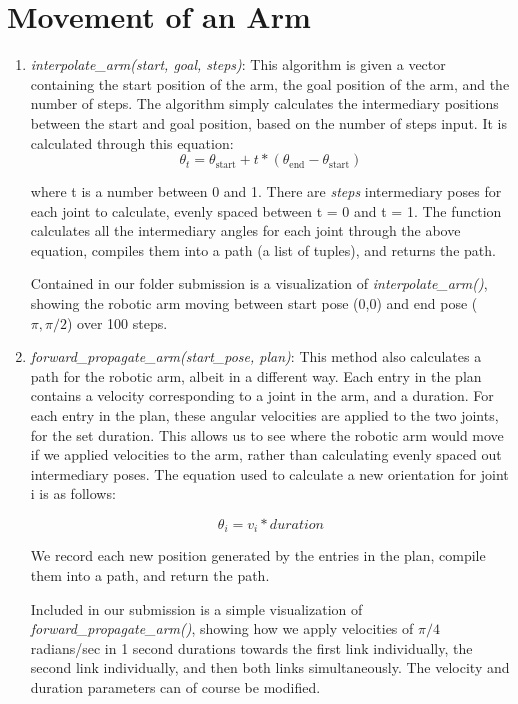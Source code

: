 \documentclass{article}
\begin{document}
\section{Movement of an Arm}
\begin{enumerate}
    \item \textit{interpolate\_arm(start, goal, steps)}: %
    This algorithm is given a vector containing the start position of the arm, the goal position of the arm, and the number of steps. The algorithm simply calculates the intermediary positions between the start and goal position, based on the number of steps input. It is calculated through this equation: 
\[\theta_t = \theta_{\text{start}} + t * (\theta_{\text{end}} - \theta_{\text{start}})\]

    where t is a number between 0 and 1. There are \textit{steps} intermediary poses for each joint to calculate, evenly spaced between t = 0 and t = 1. The function calculates all the intermediary angles for each joint through the above equation, compiles them into a path (a list of tuples), and returns the path.

    Contained in our folder submission is a visualization of \textit{interpolate\_arm()}, showing the robotic arm moving between start pose (0,0) and end pose (\(\pi, \pi/2\)) over 100 steps.

    \item \textit{forward\_propagate\_arm(start\_pose, plan)}: 
    This method also calculates a path for the robotic arm, albeit in a different way. Each entry in the plan contains a velocity corresponding to a joint in the arm, and a duration. For each entry in the plan, these angular velocities are applied to the two joints, for the set duration. This allows us to see where the robotic arm would move if we applied velocities to the arm, rather than calculating evenly spaced out intermediary poses. The equation used to calculate a new orientation for joint i is as follows:
    
\[\theta_i = v_i * duration\]

    We record each new position generated by the entries in the plan, compile them into a path, and return the path.

    Included in our submission is a simple visualization of \textit{forward\_propagate\_arm()}, showing how we apply velocities of \(\pi/4\) radians/sec in 1 second durations towards the first link individually, the second link individually, and then both links simultaneously. The velocity and duration parameters can of course be modified.


\end{enumerate}
\end{document}
